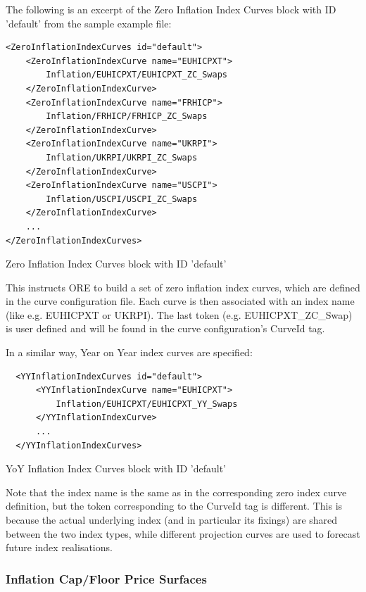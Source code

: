 \documentclass[12pt, a4paper]{article}
\begin{document}
The following is an excerpt of the Zero Inflation Index Curves block with ID 'default' from the sample example file:

\begin{listing}[H]
\begin{verbatim}
<ZeroInflationIndexCurves id="default">
    <ZeroInflationIndexCurve name="EUHICPXT">
        Inflation/EUHICPXT/EUHICPXT_ZC_Swaps
    </ZeroInflationIndexCurve>
    <ZeroInflationIndexCurve name="FRHICP">
        Inflation/FRHICP/FRHICP_ZC_Swaps
    </ZeroInflationIndexCurve>
    <ZeroInflationIndexCurve name="UKRPI">
        Inflation/UKRPI/UKRPI_ZC_Swaps
    </ZeroInflationIndexCurve>
    <ZeroInflationIndexCurve name="USCPI">
        Inflation/USCPI/USCPI_ZC_Swaps
    </ZeroInflationIndexCurve>
    ...
</ZeroInflationIndexCurves>
\end{verbatim}
\caption{Zero Inflation Index Curves block with ID 'default'}
\label{lst:zeroinflationindexcurve_spec}
\end{listing}

This instructs ORE to build a set of zero inflation index curves, which are defined in the curve configuration
file. Each curve is then associated with an index name (like e.g. EUHICPXT or UKRPI). The last token
(e.g. EUHICPXT\_ZC\_Swap) is user defined and will be found in the curve configuration's CurveId tag.

In a similar way, Year on Year index curves are specified:

\begin{listing}[H]
\begin{verbatim}
  <YYInflationIndexCurves id="default">
      <YYInflationIndexCurve name="EUHICPXT">
          Inflation/EUHICPXT/EUHICPXT_YY_Swaps
      </YYInflationIndexCurve>
      ...
  </YYInflationIndexCurves>
\end{verbatim}
\caption{YoY Inflation Index Curves block with ID 'default'}
\label{lst:yoyinflationindexcurve_spec}
\end{listing}

Note that the index name is the same as in the corresponding zero index curve definition, but the token corresponding to
the CurveId tag is different. This is because the actual underlying index (and in particular its fixings) are shared
between the two index types, while different projection curves are used to forecast future index realisations.

\subsubsection{Inflation Cap/Floor Price Surfaces}
\end{document}
